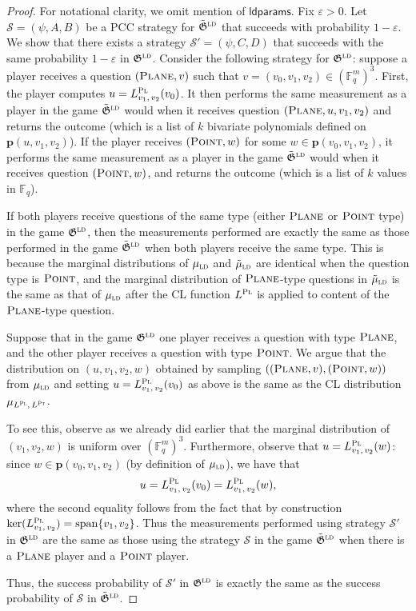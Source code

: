 \documentclass[11pt]{article}
\theoremstyle{definition}
\newcommand{\F}{\ensuremath{\mathbb{F}}}
\newcommand{\ld}{\textsc{ld}}
\newcommand{\eps}{\varepsilon}
\newcommand{\pl}{\mathbf{p}}
\newcommand{\game}{\mathfrak{G}}
\newcommand{\strategy}{\mathscr{S}}
\newcommand{\labelstyle}[1]{\ensuremath{\textsc{#1}}\xspace}
\newcommand{\plf}{\labelstyle{Pl}}
\newcommand{\ptf}{\labelstyle{Pt}}
\newcommand{\typestyle}[1]{\ensuremath{\textsc{#1}}\xspace}
\newcommand{\Plane}{\typestyle{Plane}}
\newcommand{\Point}{\typestyle{Point}}
\newcommand{\ldparams}{\mathsf{ldparams}}
\begin{document}
\begin{proof}
	For notational clarity, we omit mention of $\ldparams$.
  Fix $\eps > 0$.
  Let $\strategy = (\psi, A, B)$ be a PCC strategy for $\tilde{\game}^\ld$ that
  succeeds with probability $1 - \eps$.
  We show that there exists a strategy $\strategy' = (\psi, C, D)$ that succeeds
  with the same probability $1 - \eps$ in $\game^\ld$.
  Consider the following strategy for $\game^\ld$: suppose a player receives a
  question $(\Plane,v)$ such that $v=(v_0,v_1,v_2) \in (\F_q^m)^3$.
  First, the player computes $u = L^\plf_{v_1,\, v_2}(v_0)$.
  It then performs the same measurement as a player in the game
  $\tilde{\game}^\ld$ would when it receives question $(\Plane,u,v_1,v_2)$ and
  returns the outcome (which is a list of $k$ bivariate polynomials defined on
  $\pl(u,v_1,v_2)$).
  If the player receives $(\Point,w)$ for some $w \in \pl(v_0,v_1,v_2)$, it
  performs the same measurement as a player in the game $\tilde{\game}^\ld$
  would when it receives question $(\Point,w)$, and returns the outcome (which
  is a list of $k$ values in $\F_q$).

  If both players receive questions of the same type (either $\Plane$ or
  $\Point$ type) in the game $\game^\ld$, then the measurements performed are
  exactly the same as those performed in the game $\tilde{\game}^\ld$ when both
  players receive the same type.
  This is because the marginal distributions of $\mu_\ld$ and $\tilde{\mu}_\ld$
  are identical when the question type is $\Point$, and the marginal
  distribution of $\Plane$-type questions in $\tilde{\mu}_\ld$ is the same as
  that of $\mu_\ld$ after the CL function $L^\plf$ is applied to content of the
  $\Plane$-type question.
	
  Suppose that in the game $\game^\ld$ one player receives a question with type
  $\Plane$, and the other player receives a question with type $\Point$.
  We argue that the distribution on $(u,v_1,v_2,w)$ obtained by sampling
  $((\Plane,v),(\Point,w))$ from $\mu_{\ld}$ and setting $u = L^\plf_{v_1,\,
    v_2}(v_0)$ as above is the same as the CL distribution $\mu_{L^\plf,\,
    L^\ptf}$.

  To see this, observe as we already did earlier that the marginal distribution
  of $(v_1,v_2,w)$ is uniform over $(\F_q^m)^3$.
  Furthermore, observe that $u = L^\plf_{v_1,\, v_2}(w)$: since $w \in
  \pl(v_0,v_1,v_2)$ (by definition of $\mu_\ld$), we have that
	\[
		u = L^\plf_{v_1,\, v_2}(v_0) = L^\plf_{v_1,\, v_2}(w),
	\]
	where the second equality follows from the fact that by construction
  $\ker(L^\plf_{v_1,\, v_2}) = \mathrm{span} \{v_1,v_2\}$.
  Thus the measurements performed using strategy $\strategy'$ in $\game^\ld$ are
  the same as those using the strategy $\strategy$ in the game $\tilde{\game}^\ld$
  when there is a $\Plane$ player and a $\Point$ player.
	
	Thus, the success probability of $\strategy'$ in $\game^\ld$ is exactly the
  same as the success probability of $\strategy$ in $\tilde{\game}^\ld$.
\end{proof}
\end{document}
